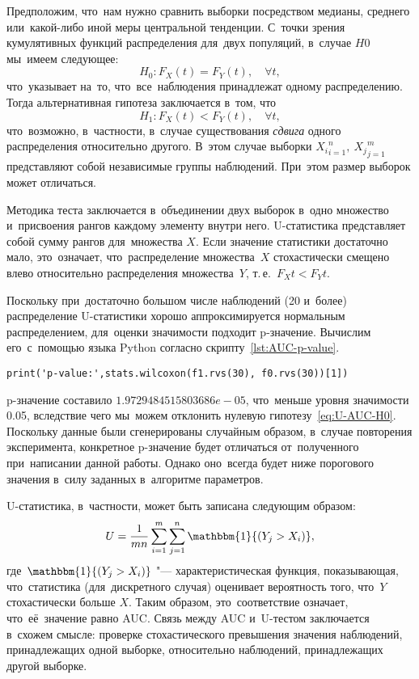\documentclass[]{scrreprt}
\begin{document}
Предположим, что~нам нужно сравнить выборки посредством медианы, среднего или~какой-либо иной меры центральной тенденции. С~точки зрения кумулятивных функций распределения для~двух популяций, в~случае $H0$ мы~имеем следующее:
\begin{equation}\label{eq:U-AUC-H0}
H_0: F_{X}(t) = F_{Y}(t), \quad \forall t,
\end{equation}
что~указывает на~то, что~все~наблюдения принадлежат одному распределению. Тогда альтернативная гипотеза заключается в~том, что
\begin{equation}\label{eq:U-AUC-H1}
H_1: F_{X}(t) < F_{Y}(t), \quad \forall t,
\end{equation}
что~возможно, в~частности, в~случае существования \emph{сдвига} одного распределения относительно другого. В~этом случае выборки ${X_{i}}_{i=1}^{n},\ {X_{j}}_{j=1}^{m}$ представляют собой независимые группы наблюдений. При~этом размер выборок может отличаться.

Методика теста заключается в~объединении двух выборок в~одно множество и~присвоения рангов каждому элементу внутри него. U-статистика представляет собой сумму рангов для~множества $X$. Если значение статистики достаточно мало, это~означает, что~распределение множества~$X$ стохастически смещено влево относительно распределения множества~$Y$, т.\,е.~$F_{X}{t} < F_{Y}{t}$.

Поскольку при~достаточно большом числе наблюдений (20 и~более) распределение U-статистики хорошо аппроксимируется нормальным распределением, для~оценки значимости подходит p-значение. Вычислим его~с~помощью языка Python согласно скрипту~\ref{lst:AUC-p-value}.
%
\begin{lstlisting}[float, caption = Вычисление p-значения для~тестовых данных, firstnumber=1, label= lst:AUC-p-value]
print('p-value:',stats.wilcoxon(f1.rvs(30), f0.rvs(30))[1])
\end{lstlisting}
%
p-значение составило $1.9729484515803686e-05$, что~меньше уровня значимости 0.05, вследствие чего мы~можем отклонить нулевую гипотезу~\ref{eq:U-AUC-H0}. Поскольку данные были сгенерированы случайным образом, в~случае повторения эксперимента, конкретное p-значение будет отличаться от~полученного при~написании данной работы. Однако оно~всегда будет ниже порогового значения в~силу заданных в~алгоритме параметров.

U-статистика, в~частности, может быть записана следующим образом:
\begin{equation}\label{eq:U-statistics}
U = \frac{1}{mn}\sum_{i=1}^{m}\sum_{j=1}^{n}\mathbbm{1}{(Y_{j}>X_{i})},
\end{equation}
где~$\mathbbm{1}{(Y_{j}>X_{i})}$ "--- характеристическая функция, показывающая, что~статистика (для~дискретного случая) оценивает вероятность того, что~$Y$ стохастически больше $X$. Таким образом, это~соответствие означает, что~её~значение равно AUC. Связь между AUC и~U-тестом заключается в~схожем смысле: проверке стохастического превышения значения наблюдений, принадлежащих одной выборке, относительно наблюдений, принадлежащих другой выборке.
\end{document}
